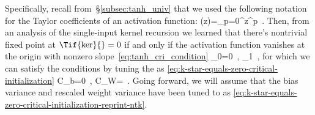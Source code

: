Specifically, recall from~\S\ref{subsec:tanh_univ} that we used the following notation for the Taylor coefficients of an activation function:
\be\label{eq:taylor-expansion-k-star-reprint}
\sigma(z)=\sum_{p=0}^{\infty}z^p\,  .
\ee
Then, from an analysis of the single-input kernel recursion we learned that there's nontrivial fixed point at $\Tif{\ker}{}=0$ if and only if the activation function vanishes at the origin with nonzero slope~\eqref{eq:tanh_cri_condition}
\be\label{eq:tanh_cri_condition-reprint-ntk}
\sigma_0=0\,  , \qquad \sigma_1\, ,
\ee
for which we can satisfy the  conditions by tuning the  as \eqref{eq:k-star-equals-zero-critical-initialization} 
\be\label{eq:k-star-equals-zero-critical-initialization-reprint-ntk}
C_b=0\,  , \qquad C_W=\, .
\ee
Going forward, we will assume that the bias variance and rescaled weight variance have been tuned to  as \eqref{eq:k-star-equals-zero-critical-initialization-reprint-ntk}. 

